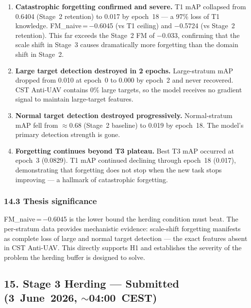 \begin{enumerate}
    \item \textbf{Catastrophic forgetting confirmed and severe.}
    T1 mAP collapsed from 0.6404 (Stage~2 retention) to 0.017 by
    epoch~18 — a 97\% loss of T1 knowledge. FM\_naive\,=\,$-$0.6045
    (vs T1 ceiling) and $-$0.5724 (vs Stage~2 retention). This far
    exceeds the Stage~2 FM of $-$0.033, confirming that the scale
    shift in Stage~3 causes dramatically more forgetting than the
    domain shift in Stage~2.

    \item \textbf{Large target detection destroyed in 2 epochs.}
    Large-stratum mAP dropped from 0.010 at epoch~0 to 0.000 by
    epoch~2 and never recovered. CST Anti-UAV contains 0\% large
    targets, so the model receives no gradient signal to maintain
    large-target features.

    \item \textbf{Normal target detection destroyed progressively.}
    Normal-stratum mAP fell from $\approx$0.68 (Stage~2 baseline)
    to 0.019 by epoch~18. The model's primary detection strength
    is gone.

    \item \textbf{Forgetting continues beyond T3 plateau.}
    Best T3 mAP occurred at epoch~3 (0.0829). T1 mAP continued
    declining through epoch~18 (0.017), demonstrating that forgetting
    does not stop when the new task stops improving --- a hallmark of
    catastrophic forgetting.
\end{enumerate}

\subsubsection*{14.3 Thesis significance}

FM\_naive\,=\,$-$0.6045 is the lower bound the herding condition
must beat. The per-stratum data provides mechanistic evidence:
scale-shift forgetting manifests as complete loss of large and normal
target detection — the exact features absent in CST Anti-UAV. This
directly supports H1 and establishes the severity of the problem
the herding buffer is designed to solve.

\subsection*{15. Stage 3 Herding — Submitted (3~June~2026, $\sim$04:00~CEST)}

